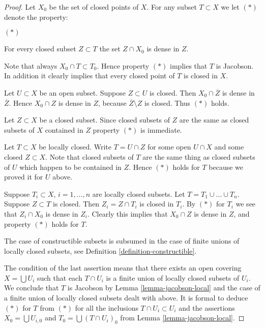 \begin{proof}
Let $X_0$ be the set of closed points of $X$. For any subset
$T \subset X$ we let $(*)$ denote the property:
\begin{list}{$(*)$}{}
\item For every closed subset $Z \subset T$ the set $Z\cap X_0$
is dense in $Z$.
\end{list}
Note that always $X_0 \cap T \subset T_0$. Hence property $(*)$
implies that $T$ is Jacobson. In addition it clearly implies
that every closed point of $T$ is closed in $X$.

\medskip\noindent
Let $U \subset X$ be an open subset.
Suppose $Z \subset U$ is closed. Then $X_0 \cap \overline{Z}$ is
dense in $\overline{Z}$. Hence $X_0 \cap Z$ is dense in $Z$, because
$\overline{Z} \setminus Z$ is closed. Thus $(*)$ holds.

\medskip\noindent
Let $Z \subset X$ be a closed subset.
Since closed subsets of $Z$ are the same as closed subsets of
$X$ contained in $Z$ property $(*)$ is immediate.

\medskip\noindent
Let $T \subset X$ be locally closed. Write $T = U \cap Z$
for some open $U \cap X$ and some closed $Z \subset X$.
Note that closed subsets of $T$ are the same thing as
closed subsets of $U$ which happen to be contained in $Z$.
Hence $(*)$ holds for $T$ because we proved it for $U$ above.

\medskip\noindent
Suppose $T_i \subset X$, $i=1,\ldots,n$ are locally closed subsets. Let
$T = T_1 \cup \ldots \cup T_n$. Suppose $Z \subset T$ is closed.
Then $Z_i = Z\cap T_i$ is closed in $T_i$. By $(*)$ for $T_i$ we see that
$Z_i \cap X_0$ is dense in $Z_i$. Clearly this implies that
$X_0 \cap Z$ is dense in $Z$, and property $(*)$ holds for
$T$.

\medskip\noindent
The case of constructible subsets is subsumed in the case
of finite unions of locally closed subsets, see Definition
\ref{definition-constructible}.

\medskip\noindent
The condition of the last assertion means that there exists
an open covering $X = \bigcup U_i$ such that each $T \cap U_i$
is a finite union of locally closed subsets of $U_i$. We conclude
that $T$ is Jacobson by Lemma \ref{lemma-jacobson-local} and the
case of a finite union of locally closed subsets dealt with above.
It is formal to deduce $(*)$ for $T$ from $(*)$ for all the inclusions
$T \cap U_i \subset U_i$ and the assertions $X_0 = \bigcup U_{i,0}$
and $T_0 = \bigcup (T\cap U_i)_0$ from Lemma \ref{lemma-jacobson-local}.
\end{proof}


